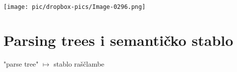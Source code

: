
\newpage
\begin{pr}\strut\newline 
\begin{center}
 \texttt{[image: pic/dropbox-pics/Image-0296.png]}
\end{center}
\end{pr}



\newpage
\section{Parsing trees i semantičko stablo}
\centerline{"parse tree" $\mapsto$ stablo raščlambe}


\vspace*{3cm}



\newpage

